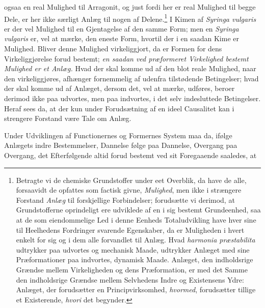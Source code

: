 \documentclass[12pt,a4paper]{book}
\begin{document}
\setcounter{footnote}{0}
ogsaa en real Mulighed til Arragonit, og just fordi her er real Mulighed
til begge Dele, er her ikke særligt Anlæg til nogen af
Delene.\footnote{Betragte vi de chemiske Grundstoffer under eet Overblik,
da have de alle, forsaavidt de opfattes som factisk givne,
\emph{Mulighed}, men ikke i strængere Forstand \emph{Anlæg} til
forskjellige Forbindelser; forudsætte vi derimod, at Grundstofferne
oprindeligt ere udviklede af en i sig bestemt Grundeenhed, saa at de som
eiendommelige Led i denne Eenheds Totaludvikling have hver sine til
Heelhedens Fordringer svarende Egenskaber, da er Muligheden i hvert
enkelt for sig og i dem alle forvandlet til Anlæg. Hvad
\textit{harmonia præstabilita} udtrykker paa udvortes og mechanisk
Maade, udtrykker Anlæget med sine Præformationer paa indvortes, dynamisk
Maade. Anlæget, den indholdsrige Grændse mellem Virkeligheden og dens
Præformation, er med det Samme den indholdsrige Grændse mellem Selvhedens
Indre og Existensens Ydre: Anlæget, der forudsætter en
Principvirksomhed, \emph{hvormed}, forudsætter tillige et Existerende,
\emph{hvori} det begynder.}
I Kimen af \textit{Syringa vulgaris} er der vel Mulighed til en
Gjentagelse af den samme Form; men en \textit{Syringa vulgaris} er, vel
at mærke, den eneste Form, hvortil der i en saadan Kime er Mulighed.
Bliver denne Mulighed virkeliggjort, da er Formen for dens
Virkeliggjørelse forud bestemt; \emph{en saadan ved præformeret
Virkelighed bestemt Mulighed er et Anlæg.} Hvad der skal komme ud af den
blot reale Mulighed, naar den virkeliggjøres, afhænger fornemmelig af
udenfra tilstødende Betingelser; hvad der skal komme ud af Anlæget,
dersom det, vel at mærke, udføres, beroer derimod ikke paa udvortes, men
paa indvortes, i det selv indesluttede Betingelser. Heraf sees da, at der
kun under Forudsætning af en ideel Causalitet kan i strengere Forstand
være Tale om Anlæg.

Under Udviklingen af Functionernes og Formernes System maa da, ifølge
Anlægets indre Bestemmelser, Dannelse følge paa Dannelse, Overgang paa
Overgang, det Efterfølgende altid forud bestemt ved sit Foregaaende
saaledes, at
\end{document}
